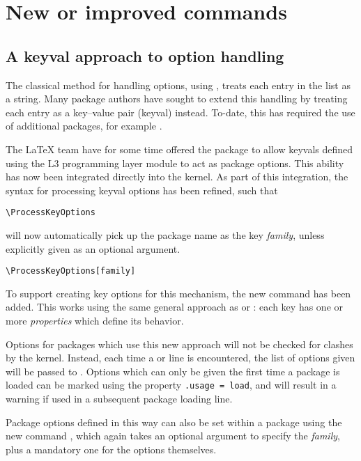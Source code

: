 \documentclass{ltnews}
\begin{document}
\section{New or improved commands}

\subsection{A keyval approach to option handling}

The classical \LaTeXe{} method for handling options, using ,
treats each entry in the list as a string. Many package authors have sought to
extend this handling by treating each entry as a key--value pair (keyval)
instead. To-date, this has required the use of additional packages, for example
.

The \LaTeX{} team have for some time offered the package  to
allow keyvals defined using the L3 programming layer module  to act
as package options. This ability has now been integrated directly into the
kernel. As part of this integration, the syntax for processing keyval options
has been refined, such that
\begin{verbatim}
\ProcessKeyOptions
\end{verbatim}
will now automatically pick up the package name as the key \emph{family},
unless explicitly given as an optional argument.
\begin{verbatim}
\ProcessKeyOptions[family]
\end{verbatim}

To support creating key options for this mechanism, the new command
 has been added. This works using the same general
approach as  or : each key has one or more
\emph{properties} which define its behavior.

Options for packages which use this new approach will not be checked for
clashes by the kernel. Instead, each time a  or
 line is encountered, the list of options given will be
passed to . Options which can only be given
the first time a package is loaded can be marked using the property
\texttt{.usage = load}, and will result in a warning if used in a subsequent
package loading line.

Package options defined in this way can also be set within a package using
the new command , which again takes an optional argument
to specify the \emph{family}, plus a mandatory one for the options themselves.
\end{document}
